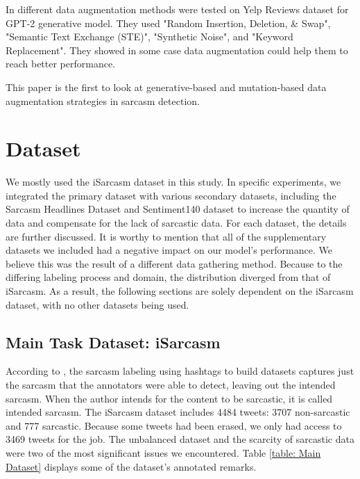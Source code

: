 \documentclass[11pt]{article}
\begin{document}
In \cite{feng2020genaug} different data augmentation methods were tested on Yelp Reviews dataset\cite{Yelpp} for GPT-2 generative model\cite{radford2019language}. They used "Random Insertion, Deletion, \& Swap", "Semantic Text Exchange (STE)", "Synthetic Noise", and "Keyword Replacement". They showed in some case data  augmentation could help them to reach better performance.

This paper is the first to look at generative-based and mutation-based data augmentation strategies in sarcasm detection.

\section{Dataset}
\label{section:dataset}

We mostly used the iSarcasm \cite{oprea2019isarcasm} dataset in this study. In specific experiments, we integrated the primary dataset with various secondary datasets, including the Sarcasm Headlines Dataset \cite{misra2019sarcasm} and Sentiment140 dataset \cite{go2009twitter} to increase the quantity of data and compensate for the lack of sarcastic data. For each dataset, the details are further discussed. It is worthy to mention that all of the supplementary datasets we included had a negative impact on our model's performance. We believe this was the result of a different data gathering method. Because to the differing labeling process and domain, the distribution diverged from that of iSarcasm. As a result, the following sections are solely dependent on the iSarcasm dataset, with no other datasets being used.

\subsection{Main Task Dataset: iSarcasm}
According to \cite{oprea2019isarcasm}, the sarcasm labeling using hashtags to build datasets captures just the sarcasm that the annotators were able to detect, leaving out the intended sarcasm. When the author intends for the content to be sarcastic, it is called intended sarcasm. The iSarcasm dataset includes 4484 tweets: 3707 non-sarcastic and 777 sarcastic. Because some tweets had been erased, we only had access to 3469 tweets for the job. The unbalanced dataset and the scarcity of sarcastic data were two of the most significant issues we encountered. Table \ref{table: Main Dataset} displays some of the dataset's annotated remarks.
\end{document}
